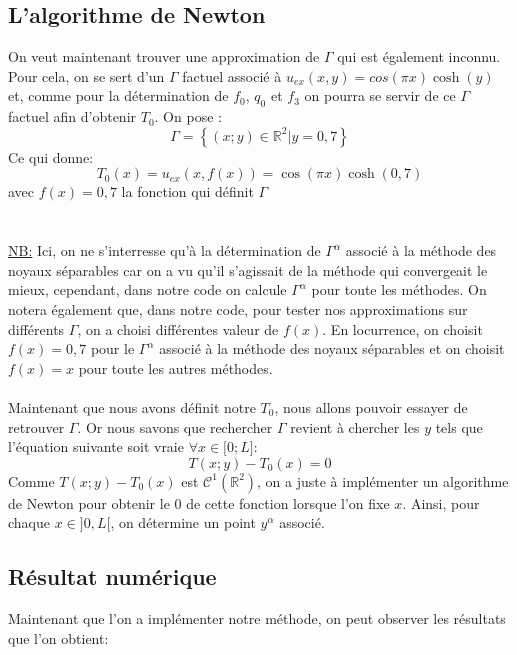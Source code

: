 \documentclass{article}
\begin{document}
\subsection{L'algorithme de Newton}
On veut maintenant trouver une approximation de $\Gamma$ qui est également inconnu. Pour cela, on se sert d'un  $\Gamma$ factuel associé à $u_{ex}(x,y)=cos(\pi x)\cosh \left(y\right)$ et, comme pour la détermination de $f_0$, $q_0$ et $f_3$ on pourra se servir de ce $\Gamma$ factuel afin d'obtenir $T_0$.
On pose :
\[
\Gamma=\left\{ (x;y)\in\mathbb{R}^2|y=0,7\right\}
\]
Ce qui donne:
\[
T_0(x)=u_{ex}(x,f(x))=\cos(\pi x)\cosh \left(0,7\right)
\]
avec $f(x)=0,7$ la fonction qui définit $\Gamma$\\
\\
\\
\underline{NB:} Ici, on ne s'interresse qu'à la détermination de $\Gamma^\alpha$ associé à la méthode des noyaux séparables car on a vu qu'il s'agissait de la méthode qui convergeait le mieux, cependant, dans notre code on calcule $\Gamma^\alpha$ pour toute les méthodes. On notera également que, dans notre code, pour tester nos approximations sur différents $\Gamma$, on a choisi différentes valeur de $f(x)$. En locurrence, on choisit $f(x)=0,7$ pour le $\Gamma^\alpha$ associé à la méthode des noyaux séparables et on choisit $f(x)=x$ pour toute les autres méthodes.\\
\\

Maintenant que nous avons définit notre $T_0$, nous allons pouvoir essayer de retrouver $\Gamma$. Or nous savons que rechercher $\Gamma$ revient à chercher les $y$ tels que l'équation suivante soit vraie $\forall x \in \lbrack 0;L\rbrack$:
\[
T(x;y)-T_0(x)=0
\]
Comme $T(x;y)-T_0(x)$ est $\mathcal{C}^1(\mathbb{R}^2)$, on a juste à implémenter un algorithme de Newton pour obtenir le 0 de cette fonction lorsque l'on fixe $x$.
Ainsi, pour chaque $x\in\rbrack 0,L\lbrack$, on détermine un point $y^\alpha$ associé.
\subsection{Résultat numérique}
Maintenant que l'on a implémenter notre méthode, on peut observer les résultats que l'on obtient:
\end{document}

